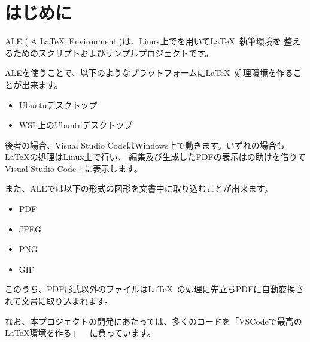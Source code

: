 \chapter*{はじめに}
\label{sec:preface}

ALE ( A \LaTeX\ Environment )は、Linux上でを用いて\LaTeX\ 執筆環境を
整えるためのスクリプトおよびサンプルプロジェクトです。

ALEを使うことで、以下のようなプラットフォームに\LaTeX\ 処理環境を作ることが出来ます。
\begin{itemize}
  \item Ubuntuデスクトップ
  \item WSL上のUbuntuデスクトップ
\end{itemize}
後者の場合、Visual Studio CodeはWindows上で動きます。いずれの場合もLaTeXの処理はLinux上で行い、
編集及び生成したPDFの表示はの助けを借りてVisual Studio Code上に表示します。

また、ALEでは以下の形式の図形を文書中に取り込むことが出来ます。
\begin{itemize}
  \item PDF
  \item JPEG
  \item PNG
  \item GIF
\end{itemize}
このうち、PDF形式以外のファイルは\LaTeX\ の処理に先立ちPDFに自動変換されて文書に取り込まれます。


なお、本プロジェクトの開発にあたっては、多くのコードを「VSCodeで最高のLaTeX環境を作る」
~\cite{best_latex_env}
に負っています。